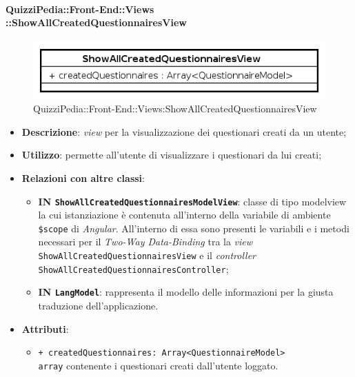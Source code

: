 \paragraph{QuizziPedia::Front-End::Views\\::ShowAllCreatedQuestionnairesView}
\begin{figure} [ht]
	\centering
	\includegraphics[scale=0.80]{UML/Classi/Front-End/QuizziPedia_Front-end_Views_ShowAllCreatedQuestionnairesView.png}
	\caption{QuizziPedia::Front-End::Views:ShowAllCreatedQuestionnairesView}
\end{figure} \FloatBarrier
\begin{itemize}
	\item \textbf{Descrizione}: \textit{view} per la visualizzazione dei questionari creati da un utente;
	\item \textbf{Utilizzo}: permette all'utente di visualizzare i questionari da lui creati;
	\item \textbf{Relazioni con altre classi}:
	\begin{itemize}
		\item \textbf{IN \texttt{ShowAllCreatedQuestionnairesModelView}}: classe di tipo modelview la cui istanziazione è contenuta all'interno della variabile di ambiente \texttt{\$scope} di \textit{Angular}. All'interno di essa sono presenti le variabili e i metodi necessari per il \textit{Two-Way Data-Binding} tra la \textit{view} \texttt{ShowAllCreatedQuestionnairesView} e il \textit{controller} \texttt{ShowAllCreatedQuestionnairesController};
		\item \textbf{IN \texttt{LangModel}}: rappresenta il modello delle informazioni per la giusta traduzione dell'applicazione.
	\end{itemize}
		\item \textbf{Attributi}:
		\begin{itemize}
			\item \texttt{+ createdQuestionnaires: Array<QuestionnaireModel>} \\ \texttt{array} contenente i questionari creati dall'utente loggato. 
		\end{itemize}
\end{itemize}